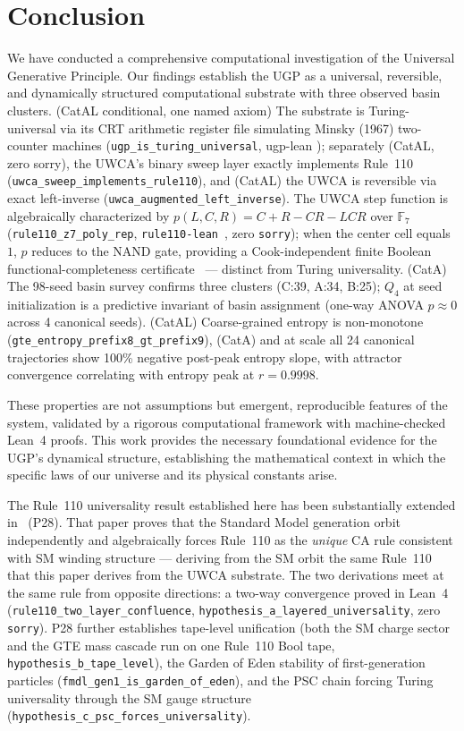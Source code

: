 \documentclass[11pt]{article}
\begin{document}
\section{Conclusion}
We have conducted a comprehensive computational investigation of the Universal Generative Principle. Our findings establish the UGP as a universal, reversible, and dynamically structured computational substrate with three observed basin clusters. (CatAL conditional, one named axiom) The substrate is Turing-universal via its CRT arithmetic register file simulating Minsky (1967) two-counter machines (\texttt{ugp\_is\_turing\_universal}, ugp-lean \cite{ugp-lean}); separately (CatAL, zero sorry), the UWCA's binary sweep layer exactly implements Rule~110 (\texttt{uwca\_sweep\_implements\_rule110}), and (CatAL) the UWCA is reversible via exact left-inverse (\texttt{uwca\_augmented\_left\_inverse}). The UWCA step function is algebraically characterized by $p(L,C,R) = C+R-CR-LCR$ over $\mathbb{F}_7$ (\texttt{rule110\_z7\_poly\_rep}, \texttt{rule110-lean}~\cite{rule110-lean}, zero \texttt{sorry}); when the center cell equals $1$, $p$ reduces to the NAND gate, providing a Cook-independent finite Boolean functional-completeness certificate~\cite{SpivackCompUniversality} --- distinct from Turing universality. (CatA) The 98-seed basin survey confirms three clusters (C:39, A:34, B:25); $Q_4$ at seed initialization is a predictive invariant of basin assignment (one-way ANOVA $p \approx 0$ across 4 canonical seeds). (CatAL) Coarse-grained entropy is non-monotone (\texttt{gte\_entropy\_prefix8\_gt\_prefix9}), (CatA) and at scale all 24 canonical trajectories show 100\% negative post-peak entropy slope, with attractor convergence correlating with entropy peak at $r = 0.9998$.

These properties are not assumptions but emergent, reproducible features of the system, validated by a rigorous computational framework with machine-checked Lean~4 proofs. This work provides the necessary foundational evidence for the UGP's dynamical structure, establishing the mathematical context in which the specific laws of our universe and its physical constants arise.

The Rule~110 universality result established here has been substantially extended in~\cite{SpivackCompUniversality} (P28). That paper proves that the Standard Model generation orbit independently and algebraically forces Rule~110 as the \emph{unique} CA rule consistent with SM winding structure — deriving from the SM orbit the same Rule~110 that this paper derives from the UWCA substrate. The two derivations meet at the same rule from opposite directions: a two-way convergence proved in Lean~4 (\texttt{rule110\_two\_layer\_confluence}, \texttt{hypothesis\_a\_layered\_universality}, zero \texttt{sorry}). P28 further establishes tape-level unification (both the SM charge sector and the GTE mass cascade run on one Rule~110 Bool tape, \texttt{hypothesis\_b\_tape\_level}), the Garden of Eden stability of first-generation particles (\texttt{fmdl\_gen1\_is\_garden\_of\_eden}), and the PSC chain forcing Turing universality through the SM gauge structure (\texttt{hypothesis\_c\_psc\_forces\_universality}).
\end{document}
